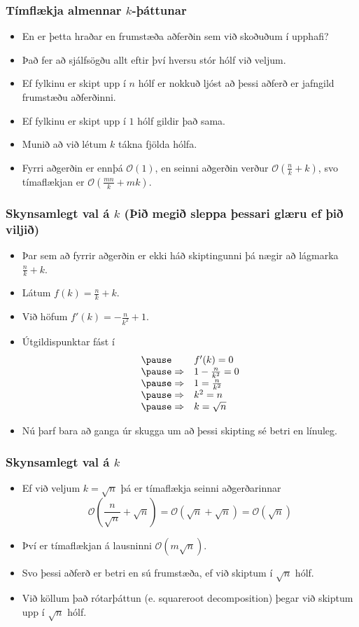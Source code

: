 \documentclass{beamer}
\renewcommand\O{\mathcal{O}}
\begin{document}
\begin{frame}
	\frametitle{Tímflækja almennar $k$-þáttunar}
\begin{itemize}
	\item<1-> En er þetta hraðar en frumstæða aðferðin sem við skoðuðum í upphafi?
	\item<2-> Það fer að sjálfsögðu allt eftir því hversu stór hólf við veljum.
	\item<3-> Ef fylkinu er skipt upp í $n$ hólf er nokkuð ljóst að þessi aðferð er jafngild frumstæðu aðferðinni.
	\item<4-> Ef fylkinu er skipt upp í $1$ hólf gildir það sama.
	\item<5-> Munið að við létum $k$ tákna fjölda hólfa.
	\item<6-> Fyrri aðgerðin er ennþá $\O(1)$, en seinni aðgerðin verður $\O\left(\frac{n}{k} + k\right )$,
		svo tímaflækjan er $\O\left (\frac{mn}{k} + mk \right )$.
\end{itemize}
\end{frame}

\begin{frame}
	\frametitle{Skynsamlegt val á $k$ (Þið megið sleppa þessari glæru ef þið viljið)}
\begin{itemize}
	\item Þar sem að fyrrir aðgerðin er ekki háð skiptingunni þá nægir að lágmarka $\frac{n}{k} + k$.
	\pause\item Látum $f(k) = \frac{n}{k} + k$.
	\pause\item Við höfum $f'(k) = -\frac{n}{k^2} + 1$.
	\pause\item Útgildispunktar fást í
		\[
			\begin{array}{l l}
			\pause& f'(k) = 0\\
			\pause\Rightarrow & 1 - \frac{n}{k^2} = 0\\
			\pause\Rightarrow & 1 = \frac{n}{k^2}\\
			\pause\Rightarrow & k^2 = n\\
			\pause\Rightarrow & k = \sqrt{n}
		\end{array}
		\]
	\pause\item Nú þarf bara að ganga úr skugga um að þessi skipting sé betri en línuleg.
\end{itemize}
\end{frame}

\begin{frame}
	\frametitle{Skynsamlegt val á $k$}
\begin{itemize}
	\item Ef við veljum $k = \sqrt{n}$ þá er tímaflækja seinni aðgerðarinnar
		\pause
		\[
			\O \left (\frac{n}{\sqrt{n}} + \sqrt{n}\right ) = \O (\sqrt{n} + \sqrt{n}) = \O (\sqrt{n})
		\]
	\pause\item Því er tímaflækjan á lausninni $\O(m\sqrt{n})$.
	\pause\item Svo þessi aðferð er betri en sú frumstæða, ef við skiptum í $\sqrt{n}$ hólf.
	\pause\item Við köllum það rótarþáttun (e. squareroot decomposition) þegar við skiptum upp í $\sqrt{n}$ hólf.
\end{itemize}
\end{frame}
\end{document}
